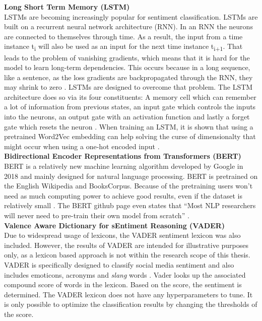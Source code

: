 \documentclass[11pt, a4paper]{article}
\begin{document}
\noindent\textbf{Long Short Term Memory (LSTM)}\\
LSTMs are becoming increasingly popular for sentiment classification. 
LSTMs are built on a recurrent neural network architecture (RNN). In an RNN the neurons are connected to themselves through time. 
As a result, the input from a time instance t\textsubscript{i} will also be used as an input for the next time instance t\textsubscript{i+1}. That leads to the 
problem of vanishing gradients, which means that it is hard for the model to learn long-term dependencies. This occurs because
in a long sequence, like a sentence, as the loss gradients are backpropagated through the RNN, they may shrink to zero \citep{vanishinggradients2020pmlr}.
LSTMs are designed to overcome that problem.
The LSTM architecture does so via its four constituents: A memory cell which can remember a lot of information 
from previous states, an input gate which controls the inputs into the neurons, an output gate with an activation function 
and lastly a forget gate which resets the neuron \citep{priyantina2019sentimentanalysishotel}. When training an LSTM, it is shown that
using a pretrained Word2Vec embedding can help solving the curse of dimensionalty that might occur when using a one-hot encoded input \citep{xiao2018word2veclstm}.\\

\noindent\textbf{Bidirectional Encoder Representations from Transformers (BERT)}\\
BERT is a relatively new machine learning algorithm developed by Google in 2018 and mainly designed for 
natural language processing. BERT is pretrained on the English Wikipedia and BooksCorpus. Because of the 
pretraining users won't need as much computing power to achieve good results, even if the dataset is relatively 
small \citep{devlin2019bert}. The BERT github page even states that 
“Most NLP researchers will never need to pre-train their own model from scratch” \citep{googlegithub}.\\

\noindent\textbf{Valence Aware Dictionary for sEntiment Reasoning (VADER)}\\
Due to widespread usage of lexicons, the VADER sentiment lexicon was also included. However, the results of VADER are intended for illustrative purposes only,
as a lexicon based approach is not within the research scope of this thesis.
VADER is specifically designed to classify social media sentiment and also includes emoticons, acronyms and \emph{slang} words \citep{hutto2015vader}. 
Vader looks up the associated compound score of words in the lexicon. Based on the score, the sentiment is determined.
The VADER lexicon does not have any hyperparameters to tune. It is only possible to optimize the classification results by
changing the thresholds of the score.
\end{document}
